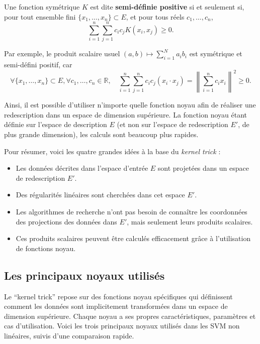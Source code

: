 Une fonction symétrique $K$ est dite \textbf{semi-définie positive} si et seulement si, pour tout ensemble fini $\{x_1, \ldots, x_n\} \subset E$, et pour tous réels $c_1, \ldots, c_n$,
\begin{equation}
\sum_{i=1}^{n} \sum_{j=1}^{n} c_i c_j K(x_i, x_j) \geq 0.
\end{equation}

Par exemple, le produit scalaire usuel $(a, b) \mapsto \sum_{i=1}^{N} a_i b_i$ est symétrique et semi-défini positif, car
\begin{equation}
\forall \{x_1, \ldots, x_n\} \subset E, \forall c_1, \ldots, c_n \in \mathbb{R}, \quad \sum_{i=1}^{n} \sum_{j=1}^{n} c_i c_j (x_i \cdot x_j) = \left\|\sum_{i=1}^{n} c_i x_i\right\|^2 \geq 0.
\end{equation}

Ainsi, il est possible d'utiliser n'importe quelle fonction noyau afin de réaliser une redescription dans un espace de dimension supérieure. La fonction noyau étant définie sur l'espace de description $E$ (et non sur l'espace de redescription $E'$, de plus grande dimension), les calculs sont beaucoup plus rapides.

Pour résumer, voici les quatre grandes idées à la base du \emph{kernel trick} :
\begin{itemize}
\item Les données décrites dans l'espace d'entrée $E$ sont projetées dans un espace de redescription $E'$.
\item Des régularités linéaires sont cherchées dans cet espace $E'$.
\item Les algorithmes de recherche n'ont pas besoin de connaître les coordonnées des projections des données dans $E'$, mais seulement leurs produits scalaires.
\item Ces produits scalaires peuvent être calculés efficacement grâce à l'utilisation de fonctions noyau.
\end{itemize}

\subsection{Les principaux noyaux utilisés}

Le ``kernel trick'' repose sur des fonctions noyau spécifiques qui définissent comment les données sont implicitement transformées dans un espace de dimension supérieure. Chaque noyau a ses propres caractéristiques, paramètres et cas d'utilisation. Voici les trois principaux noyaux utilisés dans les SVM non linéaires, suivis d'une comparaison rapide.


